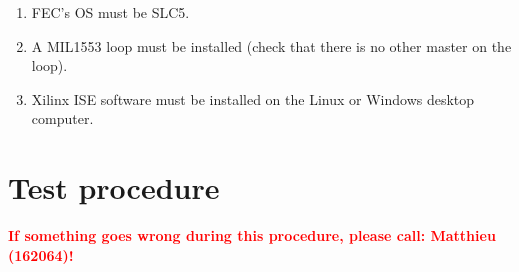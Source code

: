 \documentclass[11pt,a4paper]{article}
\begin{document}
\begin{enumerate}
	\item FEC's OS must be SLC5.
	\item A MIL1553 loop must be installed (check that there is no other master on the loop).
	\item Xilinx ISE software must be installed on the Linux or Windows desktop computer.
\end{enumerate}


\section{Test procedure}

\textcolor{red}{\textbf{If something goes wrong during this procedure, please call: \newline Matthieu (162064)!}}
\end{document}
